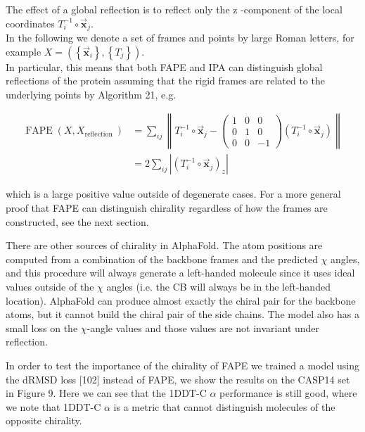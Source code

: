\documentclass[10pt]{article}
\begin{document}
The effect of a global reflection is to reflect only the z -component of the local coordinates $T_{i}^{-1} \circ \overrightarrow{\mathbf{x}}_{j}$.\\
In the following we denote a set of frames and points by large Roman letters, for example $X=\left(\left\{\overrightarrow{\mathbf{x}}_{i}\right\},\left\{T_{j}\right\}\right)$.\\
In particular, this means that both FAPE and IPA can distinguish global reflections of the protein assuming that the rigid frames are related to the underlying points by Algorithm 21, e.g.


\begin{align*}
\operatorname{FAPE}\left(X, X_{\text {reflection }}\right) & =\sum_{i j}\left\|T_{i}^{-1} \circ \overrightarrow{\mathbf{x}}_{j}-\left(\begin{array}{rrr}
1 & 0 & 0 \\
0 & 1 & 0 \\
0 & 0 & -1
\end{array}\right)\left(T_{i}^{-1} \circ \overrightarrow{\mathbf{x}}_{j}\right)\right\|  \tag{16}\\
& =2 \sum_{i j}\left|\left(T_{i}^{-1} \circ \overrightarrow{\mathbf{x}}_{j}\right)_{z}\right| \tag{17}
\end{align*}


which is a large positive value outside of degenerate cases. For a more general proof that FAPE can distinguish chirality regardless of how the frames are constructed, see the next section.

There are other sources of chirality in AlphaFold. The atom positions are computed from a combination of the backbone frames and the predicted $\chi$ angles, and this procedure will always generate a left-handed molecule since it uses ideal values outside of the $\chi$ angles (i.e. the CB will always be in the left-handed location). AlphaFold can produce almost exactly the chiral pair for the backbone atoms, but it cannot build the chiral pair of the side chains. The model also has a small loss on the $\chi$-angle values and those values are not invariant under reflection.

In order to test the importance of the chirality of FAPE we trained a model using the dRMSD loss [102] instead of FAPE, we show the results on the CASP14 set in Figure 9. Here we can see that the 1DDT-C $\alpha$ performance is still good, where we note that 1DDT-C $\alpha$ is a metric that cannot distinguish molecules of the opposite chirality.
\end{document}
